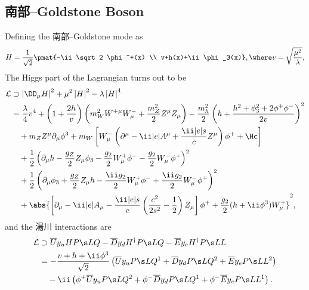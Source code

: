 \subsection{南部--Goldstone Boson}
Defining the 南部--Goldstone mode as
\begin{equation}
 H = \frac1{\sqrt2}\pmat{-\ii \sqrt2 \phi^+(x) \\ v+h(x)+\ii\phi_3(x)}, \where v=\sqrt{\frac{\mu^2}{\lambda}},
\end{equation}
The Higgs part of the Lagrangian turns out to be
\begin{align}\begin{split}
 \Lag&\supset \left|\DD_\mu H\right|^2 + \mu^2\left|H\right|^2 - \lambda\left|H\right|^4\\
&=
\frac{\lambda}{4}v^4+ \left(1+\frac{2h}{v}\right)\left(m_W^2 W^{+\mu}W^-_\mu + \frac{m_Z^2}2Z^\mu Z_\mu\right)
 -
\frac{m_h^2}{2}\left(h+\frac{h^2+\phi_3^2+2\phi^+\phi^-}{2v}\right)^2
\\&\quad
+m_Z Z^\mu\Pm\phi^3
+m_W
\left[
W^-_\mu\left(
\partial^\mu
-\ii|e|A^\mu+\frac{\ii|e|s}{c}Z^\mu
\right)\phi^+
+\Hc\right]
\\&\quad
+\frac12\left(\Pm h-\frac{g_Z}2 Z_\mu\phi_3-\frac{g_2}{2} W_\mu^+\phi^- -\frac{g_2}{2} W_\mu^-\phi^+\right)^2
\\&\quad
+
\frac12\left(\Pm\phi_3+\frac{g_Z}2 Z_\mu h -\frac{\ii g_2}{2}W_\mu^+\phi^- +\frac{\ii g_2}{2}W_\mu^-\phi^+\right)^2
\\&\quad
+\abs{\left[\Pm-\ii|e|A_\mu -\frac{\ii|e|s}{c}\left(\frac{c^2}{2s^2}-\frac12\right)
 Z_\mu\right]\phi^+ + \frac{g_2}{2}(h+\ii\phi^3) W^+_\mu}^2,
\end{split}
\end{align}
and the 湯川 interactions are
\begin{align}
\begin{split}
  \Lag&\supset
 \overline U y_uH\PL Q - \overline D y_dH^\dagger\PL Q - \overline E y_eH^\dagger\PL L
 \\&
 =-\frac{v+h+\ii\phi^3}{\sqrt2}\left(
   \overline U y_u\PL Q^1
 + \overline D y_d\PL Q^2
 + \overline E y_e\PL L^2
 \right)
\\&\quad
 -\ii
 \left(
 \phi^+ \overline Uy_u\PL Q^2+\phi^-\overline D y_d\PL Q^1+\phi^-\overline Ey_e\PL L^1
 \right).
\end{split}
\end{align}
